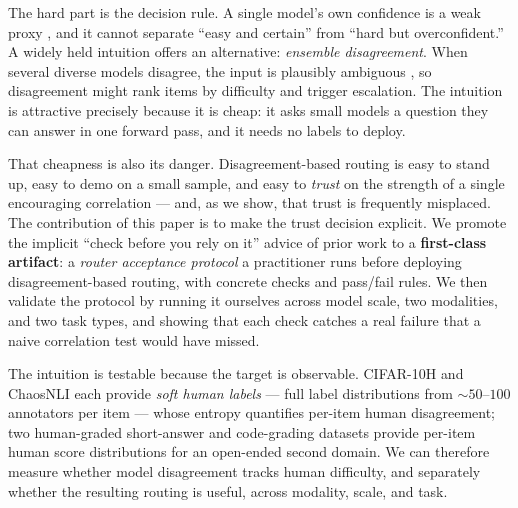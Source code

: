 \documentclass[letterpaper]{article} %
\begin{document}
The hard part is the decision rule. A single model's own confidence is a weak
proxy \citep{hendrycks2017baseline, guo2017calibration}, and it cannot separate
``easy and certain'' from ``hard but overconfident.'' A widely held intuition
offers an alternative: \emph{ensemble disagreement}. When several diverse models
disagree, the input is plausibly ambiguous
\citep{lakshminarayanan2017simple, gal2016dropout}, so disagreement might rank
items by difficulty and trigger escalation. The intuition is attractive precisely
because it is cheap: it asks small models a question they can answer in one
forward pass, and it needs no labels to deploy.

That cheapness is also its danger. Disagreement-based routing is easy to stand up,
easy to demo on a small sample, and easy to \emph{trust} on the strength of a
single encouraging correlation --- and, as we show, that trust is frequently
misplaced. The contribution of this paper is to make the trust decision explicit.
We promote the implicit ``check before you rely on it'' advice of prior work to a
\textbf{first-class artifact}: a \emph{router acceptance protocol} a practitioner
runs before deploying disagreement-based routing, with concrete checks and
pass/fail rules. We then validate the protocol by running it ourselves across
model scale, two modalities, and two task types, and showing that each check
catches a real failure that a naive correlation test would have missed.

The intuition is testable because the target is observable. CIFAR-10H
\citep{peterson2019human} and ChaosNLI \citep{nie2020chaosnli} each provide
\emph{soft human labels} --- full label distributions from $\sim\!50$--$100$
annotators per item --- whose entropy quantifies per-item human disagreement; two
human-graded short-answer and code-grading datasets provide per-item human score
distributions for an open-ended second domain. We can therefore measure whether
model disagreement tracks human difficulty, and separately whether the resulting
routing is useful, across modality, scale, and task.
\end{document}
